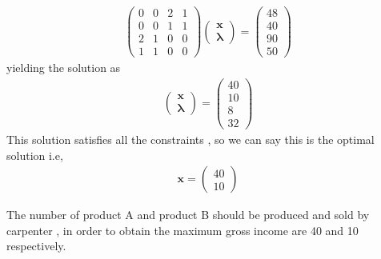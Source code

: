 \documentclass[journal,12pt,twocolumn]{IEEEtran}
\newcommand{\myvec}[1]{\ensuremath{\begin{pmatrix}#1\end{pmatrix}}}
\let\vec\mathbf
\begin{document}
\begin{enumerate}
\begin{enumerate}
        \begin{align}
            \myvec{0 & 0 & 2 & 1 \\
        		   0 & 0 & 1 & 1 \\
        		   2 & 1 & 0 & 0 \\
        		   1 & 1 & 0 & 0 }
        	\myvec{\vec{x} \\ \bm{\lambda}} = \myvec{48\\40\\90\\50}
        \end{align}
        yielding the solution as
        \begin{align}
        	\myvec{\vec{x} \\ \bm{\lambda}} = \myvec{40\\10\\8\\32}
        \end{align}
        This solution satisfies all the constraints , so we can say this is the optimal solution i.e,
        \begin{align}
        	\vec{x} = \myvec{40\\10}
        \end{align}
        \end{enumerate}

        The number of product A and product B should be produced and sold by carpenter , in order to obtain the maximum gross income are 40 and 10 respectively.

\end{enumerate}
\end{document}
